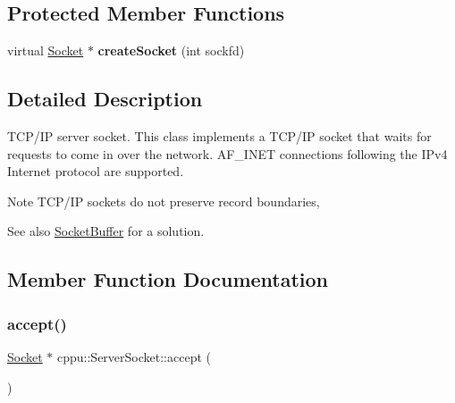 \subsection*{Protected Member Functions}
\begin{DoxyCompactItemize}
\item 
\mbox{\label{classcppu_1_1_server_socket_a23d038275576d0a969072eb334f7b84f}} 
virtual \mbox{\hyperlink{classcppu_1_1_socket}{Socket}} $\ast$ {\bfseries create\+Socket} (int sockfd)
\end{DoxyCompactItemize}


\subsection{Detailed Description}
T\+C\+P/\+IP server socket. This class implements a T\+C\+P/\+IP socket that waits for requests to come in over the network. A\+F\+\_\+\+I\+N\+ET connections following the I\+Pv4 Internet protocol are supported. 

\begin{DoxyNote}{Note}
T\+C\+P/\+IP sockets do not preserve record boundaries, 
\end{DoxyNote}
\begin{DoxySeeAlso}{See also}
\mbox{\hyperlink{classcppu_1_1_socket_buffer}{Socket\+Buffer}} for a solution. 
\end{DoxySeeAlso}


\subsection{Member Function Documentation}
\mbox{\label{classcppu_1_1_server_socket_af08ebcb886fc778d195fb622f7b96b8b}} 
\subsubsection{\texorpdfstring{accept()}{accept()}}
{\footnotesize\ttfamily \mbox{\hyperlink{classcppu_1_1_socket}{Socket}} $\ast$ cppu\+::\+Server\+Socket\+::accept (\begin{DoxyParamCaption}{ }\end{DoxyParamCaption})\hspace{0.3cm}{\ttfamily [virtual]}}



